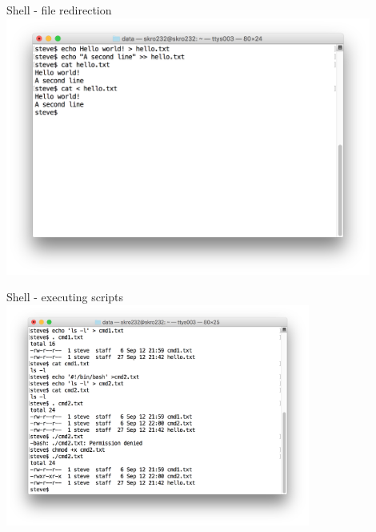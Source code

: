 \documentclass[t]{beamer}
\begin{document}
\begin{frame}{Shell - file redirection}
  \includegraphics[width=12cm,scale=0.4]{images/file-redir.png}
  \note{
       }
\end{frame}

\begin{frame}{Shell - executing scripts}
  \includegraphics[width=10cm,scale=0.4]{images/scripting.png}
  \note{
}
\end{frame}
\end{document}

